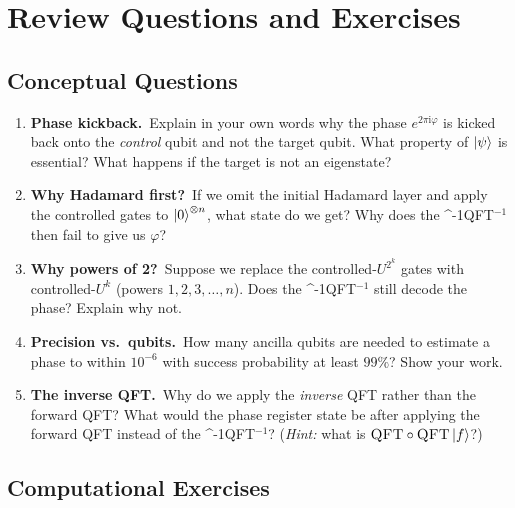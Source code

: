 \documentclass[12pt,a4paper]{article}
\newcommand{\QFT}{\textsc{QFT}}
\newcommand{\IQFT}{\ifmmode \text{\textsc{QFT}}^{-1}\else \textsc{QFT}$^{-1}$\fi}
\newcommand{\ii}{\mathrm{i}}
\begin{document}
\section{Review Questions and Exercises}
\label{sec:exercises}

\subsection{Conceptual Questions}

\begin{enumerate}[label=\textbf{Q\arabic*.}, leftmargin=*]
  \item \textbf{Phase kickback.}\ Explain in your own words why the phase
        $e^{2\pi\ii\varphi}$ is kicked back onto the \emph{control} qubit
        and not the target qubit.  What property of $\Ket{\psi}$ is essential?
        What happens if the target is not an eigenstate?

  \item \textbf{Why Hadamard first?}\ If we omit the initial Hadamard layer
        and apply the controlled gates to $\Ket{0}^{\otimes n}$, what state
        do we get?  Why does the \IQFT{} then fail to give us $\varphi$?

  \item \textbf{Why powers of 2?}\ Suppose we replace the controlled-$U^{2^k}$
        gates with controlled-$U^k$ (powers $1, 2, 3, \ldots, n$).  Does the
        \IQFT{} still decode the phase?  Explain why not.

  \item \textbf{Precision vs.\ qubits.}\ How many ancilla qubits are needed to
        estimate a phase to within $10^{-6}$ with success probability at
        least $99\%$?  Show your work.

  \item \textbf{The inverse QFT.}\ Why do we apply the \emph{inverse} QFT
        rather than the forward QFT?  What would the phase register state
        be after applying the forward QFT instead of the \IQFT{}?
        (\emph{Hint:} what is $\QFT\circ\QFT\Ket{f}$?)
\end{enumerate}

\subsection{Computational Exercises}
\end{document}
